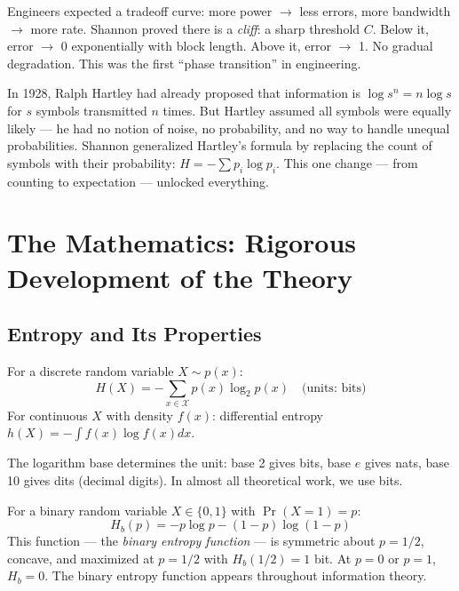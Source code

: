 Engineers expected a tradeoff curve: more power $\to$ less errors, more bandwidth $\to$ more rate. Shannon proved there is a \emph{cliff}: a sharp threshold $C$. Below it, error $\to$ 0 exponentially with block length. Above it, error $\to$ 1. No gradual degradation. This was the first ``phase transition'' in engineering.

In 1928, Ralph Hartley had already proposed that information is $\log s^n = n\log s$ for $s$ symbols transmitted $n$ times. But Hartley assumed all symbols were equally likely — he had no notion of noise, no probability, and no way to handle unequal probabilities. Shannon generalized Hartley's formula by replacing the count of symbols with their probability: $H = -\sum p_i \log p_i$. This one change — from counting to expectation — unlocked everything.

\section{The Mathematics: Rigorous Development of the Theory}
\label{sec:information:math}

\subsection{Entropy and Its Properties}
\label{sec:information:entropy}

\begin{definition}[Entropy]
For a discrete random variable $X \sim p(x)$:
\[
H(X) = -\sum_{x \in \mathcal{X}} p(x) \log_2 p(x) \quad \text{(units: bits)}
\]
For continuous $X$ with density $f(x)$: differential entropy $h(X) = -\int f(x) \log f(x) dx$.
\end{definition}

The logarithm base determines the unit: base 2 gives bits, base $e$ gives nats, base 10 gives dits (decimal digits). In almost all theoretical work, we use bits.

\begin{example}
For a binary random variable $X \in \{0,1\}$ with $\Pr(X=1)=p$:
\[
H_b(p) = -p\log p - (1-p)\log(1-p)
\]
This function — the \emph{binary entropy function} — is symmetric about $p=1/2$, concave, and maximized at $p=1/2$ with $H_b(1/2) = 1$ bit. At $p=0$ or $p=1$, $H_b = 0$. The binary entropy function appears throughout information theory.
\end{example}


